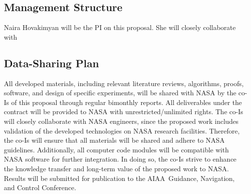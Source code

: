 \documentclass[letter,onecolumn,12pt]{aiaa-tc}
\newcommand{\1}{1_n}
\begin{document}
\subsection{Management Structure}

Naira Hovakimyan will be the PI on this proposal. She will closely collaborate with


\subsection{Data-Sharing Plan}

All developed materials, including relevant literature reviews, algorithms, proofs, software, and design of specific experiments, will be shared with NASA by the co-Is of this proposal through regular bimonthly reports. All deliverables under the contract will be provided to NASA with unrestricted/unlimited rights. The co-Is will closely collaborate with NASA engineers, since the proposed work includes validation of the developed technologies on NASA research facilities. Therefore, the co-Is will ensure that all materials will be shared and adhere to NASA guidelines. Additionally, all computer code modules will be compatible with NASA software for further integration. In doing so, the co-Is strive to enhance the knowledge transfer and long-term value of the proposed work to NASA. Results will be submitted for publication to the AIAA~Guidance, Navigation, and Control Conference.






\clearpage
{}


\end{document}
